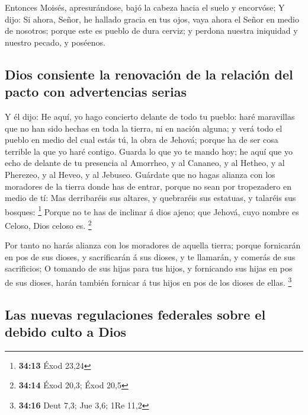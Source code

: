 Entonces Moisés, apresurándose, bajó la cabeza hacia el
suelo y encorvóse;  Y dijo: Si ahora, Señor, he hallado
gracia en tus ojos, vaya ahora el Señor en medio de nosotros; porque
este es pueblo de dura cerviz; y perdona nuestra iniquidad y nuestro
pecado, y poséenos.

\hypertarget{dios-consiente-la-renovaciuxf3n-de-la-relaciuxf3n-del-pacto-con-advertencias-serias}{%
\subsection{Dios consiente la renovación de la relación del pacto con
advertencias
serias}\label{dios-consiente-la-renovaciuxf3n-de-la-relaciuxf3n-del-pacto-con-advertencias-serias}}

 Y él dijo: He aquí, yo hago concierto delante de todo tu
pueblo: haré maravillas que no han sido hechas en toda la tierra, ni en
nación alguna; y verá todo el pueblo en medio del cual estás tú, la obra
de Jehová; porque ha de ser cosa terrible la que yo haré contigo.
 Guarda lo que yo te mando hoy; he aquí que yo echo de
delante de tu presencia al Amorrheo, y al Cananeo, y al Hetheo, y al
Pherezeo, y al Heveo, y al Jebuseo.  Guárdate que no hagas
alianza con los moradores de la tierra donde has de entrar, porque no
sean por tropezadero en medio de tí:  Mas derribaréis sus
altares, y quebraréis sus estatuas, y talaréis sus bosques: \footnote{\textbf{34:13}
  Éxod 23,24}  Porque no te has de inclinar á dios ajeno;
que Jehová, cuyo nombre es Celoso, Dios celoso es. \footnote{\textbf{34:14}
  Éxod 20,3; Éxod 20,5}

 Por tanto no harás alianza con los moradores de aquella
tierra; porque fornicarán en pos de sus dioses, y sacrificarán á sus
dioses, y te llamarán, y comerás de sus sacrificios;  O
tomando de sus hijas para tus hijos, y fornicando sus hijas en pos de
sus dioses, harán también fornicar á tus hijos en pos de los dioses de
ellas. \footnote{\textbf{34:16} Deut 7,3; Jue 3,6; 1Re 11,2}

\hypertarget{las-nuevas-regulaciones-federales-sobre-el-debido-culto-a-dios}{%
\subsection{Las nuevas regulaciones federales sobre el debido culto a
Dios}\label{las-nuevas-regulaciones-federales-sobre-el-debido-culto-a-dios}}

